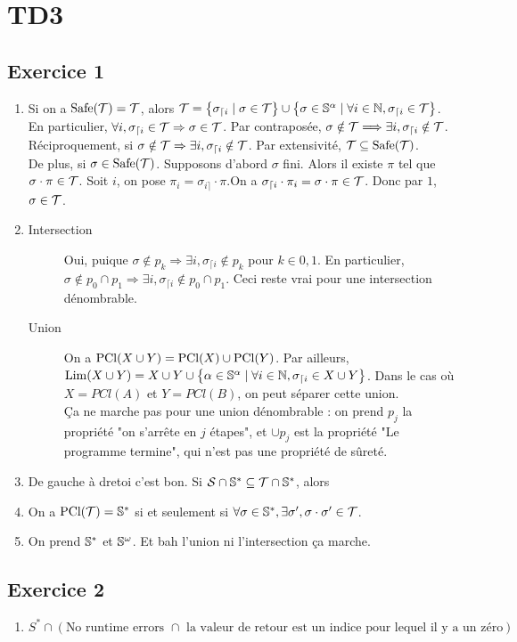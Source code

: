 \documentclass{cours}
\begin{document}
\section{TD3}
\subsection{Exercice 1}
\begin{enumerate}
    \item Si on a $\rm Safe(\mT)= \mT$, alors $\mT = \left\{\sigma_{\lceil i} \mid \sigma\in \mT\right\} \cup \left\{\sigma \in \S^{\alpha} \mid \forall i \in \N, \sigma_{\lceil i} \in \mT\right\}$. En particulier, $\forall i, \sigma_{\lceil i} \in \mT \Rightarrow \sigma \in \mT$. Par contraposée, $\sigma \notin \mT \Longrightarrow \exists i, \sigma_{\lceil i} \notin \mT$.\\
    Réciproquement, si $\sigma \notin \mT \Rightarrow \exists i, \sigma_{\lceil i} \notin \mT$. Par extensivité, $\mT \subseteq \rm Safe(\mT)$. \\
    De plus, si $\sigma \in \rm Safe(\mT)$. 
    Supposons d'abord $\sigma$ fini. Alors il existe $\pi$ tel que $\sigma \cdot \pi \in \mT$. Soit $i$, on pose $\pi_{i} = \sigma_{i\rceil} \cdot \pi$.On a $\sigma_{\lceil i}\cdot \pi_{i} = \sigma \cdot \pi \in \mT$. Donc par $1$, $\sigma \in \mT$.
    \item \begin{description}
        \item[Intersection] Oui, puique $\sigma \notin p_{k} \Rightarrow \exists i, \sigma_{\lceil i} \notin p_{k}$ pour $k \in 0, 1$. En particulier, $\sigma \notin p_{0} \cap p_{1} \Rightarrow \exists i, \sigma_{\lceil i} \notin p_{0} \cap p_{1}$. Ceci reste vrai pour une intersection dénombrable.
        \item[Union] On a $\mathrm{PCl}(X \cup Y) = {\rm PCl}(X) \cup {\rm PCl}(Y)$. Par ailleurs, ${\rm Lim}(X \cup Y) = X \cup Y \cup \left\{\alpha \in \S^{\alpha} \mid \forall i \in \N, \sigma_{\lceil i} \in X \cup Y\right\}$. Dans le cas où $X = PCl(A)$ et $Y = PCl(B)$, on peut séparer cette union. \\
        Ça ne marche pas pour une union dénombrable : on prend $p_{j}$ la propriété "on s'arrête en $j$ étapes", et $\cup p_{j}$ est la propriété "Le programme termine", qui n'est pas une propriété de sûreté. 
    \end{description}
    \item De gauche à dretoi c'est bon. Si $\mS \cap \S^{*} \subseteq \mT \cap \S^{*}$, alors
    \item On a $\rm PCl(\mT) = \S^{*}$ si et seulement si $\forall \sigma \in \S^{*}, \exists \sigma', \sigma \cdot \sigma' \in \mT$.   
    \item On prend $\S^{*}$ et $\S^{\omega}$. Et bah l'union ni l'intersection ça marche. 
\end{enumerate}
\subsection{Exercice 2}
\begin{enumerate}
    \item $S^{*} \cap \left(\text{No runtime errors } \cap \text{ la valeur de retour est un indice pour lequel il y a un zéro}\right)$
\end{enumerate}
\end{document}
